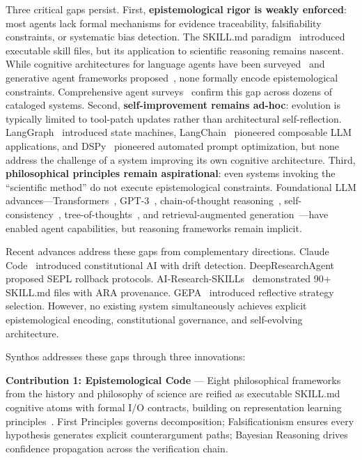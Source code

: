 \documentclass[review]{elsarticle}
\begin{document}
Three critical gaps persist. First, \textbf{epistemological rigor is weakly enforced}: most agents lack formal mechanisms for evidence traceability, falsifiability constraints, or systematic bias detection. The SKILL.md paradigm~\cite{hermes2025hermes} introduced executable skill files, but its application to scientific reasoning remains nascent. While cognitive architectures for language agents have been surveyed~\cite{sumers2023cognitive} and generative agent frameworks proposed~\cite{park2023generative}, none formally encode epistemological constraints. Comprehensive agent surveys~\cite{wang2024surveyagent,xi2023rise} confirm this gap across dozens of cataloged systems. Second, \textbf{self-improvement remains ad-hoc}: evolution is typically limited to tool-patch updates rather than architectural self-reflection. LangGraph~\cite{langchain2024langgraph} introduced state machines, LangChain~\cite{chase2022langchain} pioneered composable LLM applications, and DSPy~\cite{khattab2023dspy} pioneered automated prompt optimization, but none address the challenge of a system improving its own cognitive architecture. Third, \textbf{philosophical principles remain aspirational}: even systems invoking the ``scientific method'' do not execute epistemological constraints. Foundational LLM advances---Transformers~\cite{vaswani2017attention}, GPT-3~\cite{brown2020language}, chain-of-thought reasoning~\cite{wei2022chain}, self-consistency~\cite{wang2023selfconsistency}, tree-of-thoughts~\cite{yao2023tree}, and retrieval-augmented generation~\cite{lewis2020retrieval}---have enabled agent capabilities, but reasoning frameworks remain implicit.

Recent advances address these gaps from complementary directions. Claude Code~\cite{anthropic2025claude} introduced constitutional AI with drift detection. DeepResearchAgent~\cite{skyworkai2026deep} proposed SEPL rollback protocols. AI-Research-SKILLs~\cite{orchestra2026airesearch} demonstrated 90+ SKILL.md files with ARA provenance. GEPA~\cite{gepa2025gepa} introduced reflective strategy selection. However, no existing system simultaneously achieves explicit epistemological encoding, constitutional governance, and self-evolving architecture.

Synthos addresses these gaps through three innovations:

\textbf{Contribution 1: Epistemological Code} --- Eight philosophical frameworks from the history and philosophy of science are reified as executable SKILL.md cognitive atoms with formal I/O contracts, building on representation learning principles~\cite{bengio2013representation}. First Principles governs decomposition; Falsificationism ensures every hypothesis generates explicit counterargument paths; Bayesian Reasoning drives confidence propagation across the verification chain.
\end{document}
